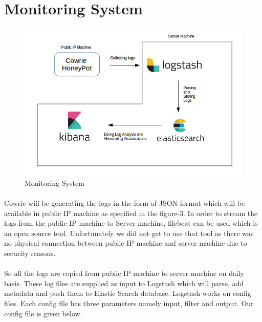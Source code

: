 \documentclass{report}
\begin{document}
\section{Monitoring System}

\begin{figure}[H]
\centering
\caption{Monitoring System}
\includegraphics[scale=0.55]{Monitoring_System}
\end{figure}

\paragraph{}
Cowrie will be generating the logs in the form of JSON format which will be available in public IP machine as specified in the figure-3. In order to stream the logs from the public IP machine to Server machine, filebeat can be used which is an open source tool. Unfortunately we did not get to use that tool as there was no physical connection between public IP machine and server machine due to security reasons. 

\paragraph{}
So all the logs are copied from public IP machine to server machine on daily basis. These log files are supplied as input to Logstash which will parse, add metadata and push them to Elastic Search database. Logstash works on config files. Each config file has three parameters namely input, filter and output. Our config file is given below.


\end{document}
